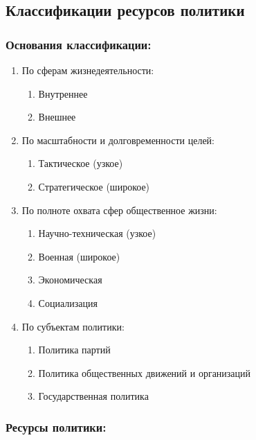 \subsection{Классификации ресурсов политики}

\subsubsection{Основания классификации:}

\begin{enumerate}
      \item По сферам жизнедеятельности:
            \begin{enumerate}
                  \item Внутреннее
                  \item Внешнее
            \end{enumerate}

      \item По масштабности и долговременности целей:
            \begin{enumerate}
                  \item Тактическое (узкое)
                  \item Стратегическое (широкое)
            \end{enumerate}

      \item По полноте охвата сфер общественное жизни:
            \begin{enumerate}
                  \item Научно-техническая (узкое)
                  \item Военная (широкое)
                  \item Экономическая
                  \item Социализация
            \end{enumerate}

      \item По субъектам политики:
            \begin{enumerate}
                  \item Политика партий
                  \item Политика общественных движений и организаций
                  \item Государственная политика
            \end{enumerate}
\end{enumerate}

\subsubsection{Ресурсы политики:}

